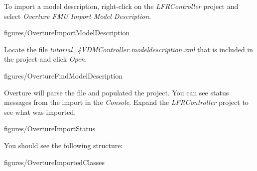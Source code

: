 \documentclass[11pt,a4paper]{../tutorial}
\begin{document}
\begin{instructions}

\item To import a model description, right-click on the \emph{LFRController} project and select \emph{Overture FMU \menusep Import Model Description}.

    \begin{annotation}[width=0.99\linewidth,trim=0 25 0 0,clip]{figures/OvertureImportModelDescription}
    \end{annotation}

\item Locate the file \emph{tutorial\_4\pathsep{}VDM\pathsep{}Controller.modeldescription.xml} that is included in the project and click \emph{Open}.


    \begin{annotation}[width=0.8\linewidth]{figures/OvertureFindModelDescription}
    \end{annotation}

\item Overture will parse the file and populated the project. You can see status messages from the import in the \emph{Console}. Expand the \emph{LFRController} project to see what was imported.

    \begin{annotation}[width=0.99\linewidth]{figures/OvertureImportStatus}
    \end{annotation}

    You should see the following structure:

    \begin{annotation}[width=0.25\linewidth,trim=0 300 535 0,clip]{figures/OvertureImportedClasses}
    \end{annotation}

\end{instructions}
\end{document}
